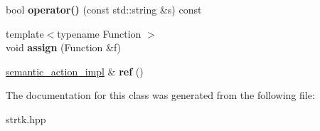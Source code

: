 \begin{DoxyCompactItemize}
\item 
\hypertarget{classstrtk_1_1util_1_1semantic__action__impl_ad250c0379751399e7129d43b19c41d5b}{bool {\bfseries operator()} (const std\-::string \&s) const }\label{classstrtk_1_1util_1_1semantic__action__impl_ad250c0379751399e7129d43b19c41d5b}

\item 
\hypertarget{classstrtk_1_1util_1_1semantic__action__impl_ab748e153745c7313f7679fc25b162e29}{{\footnotesize template$<$typename Function $>$ }\\void {\bfseries assign} (Function \&f)}\label{classstrtk_1_1util_1_1semantic__action__impl_ab748e153745c7313f7679fc25b162e29}

\item 
\hypertarget{classstrtk_1_1util_1_1semantic__action__impl_a2ad1c029ccbba245fed8312fca49cf43}{\hyperlink{classstrtk_1_1util_1_1semantic__action__impl}{semantic\-\_\-action\-\_\-impl} \& {\bfseries ref} ()}\label{classstrtk_1_1util_1_1semantic__action__impl_a2ad1c029ccbba245fed8312fca49cf43}

\end{DoxyCompactItemize}


The documentation for this class was generated from the following file\-:\begin{DoxyCompactItemize}
\item 
strtk.\-hpp\end{DoxyCompactItemize}
